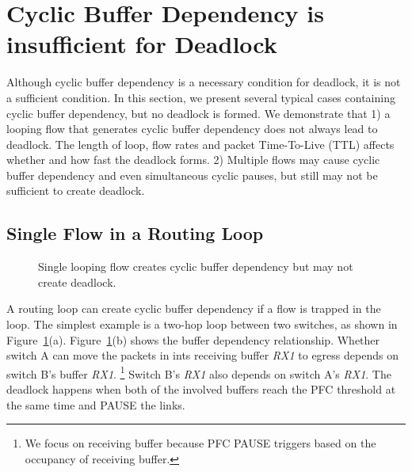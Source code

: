 \section{Cyclic Buffer Dependency is insufficient for Deadlock}\label{sec:casestudy}

Although cyclic buffer dependency is a necessary condition for deadlock, it is not a
sufficient condition. In this section, we present several typical cases containing cyclic 
buffer dependency, but no deadlock is formed. We demonstrate 
that 1) a looping flow that generates cyclic buffer dependency does not always lead to deadlock. 
The length of loop, flow rates and packet Time-To-Live (TTL) affects whether and how fast 
the deadlock forms. 2) Multiple flows may cause cyclic buffer dependency and even simultaneous cyclic pauses,
but still may not be sufficient to create deadlock. 

\subsection{Single Flow in a Routing Loop}

\begin{figure}[t]
\centering
{}
\caption{Single looping flow creates cyclic buffer dependency but may not create deadlock.}
\label{fig:loop}
\end{figure}


A routing loop can create cyclic buffer dependency if a flow is trapped in the loop.
The simplest example is a two-hop loop between two switches, as shown in Figure~\ref{fig:loop}(a).
Figure~\ref{fig:loop}(b) shows the buffer dependency relationship. Whether switch A can move
the packets in ints receiving buffer {\em RX1} to egress depends on switch B's buffer {\em RX1}.
\footnote{We focus on receiving buffer because PFC PAUSE triggers based on the occupancy of receiving buffer.}
Switch B's {\em RX1} also depends on switch A's {\em RX1}. The deadlock happens when
both of the involved buffers reach the PFC threshold at the same time and PAUSE the links.


